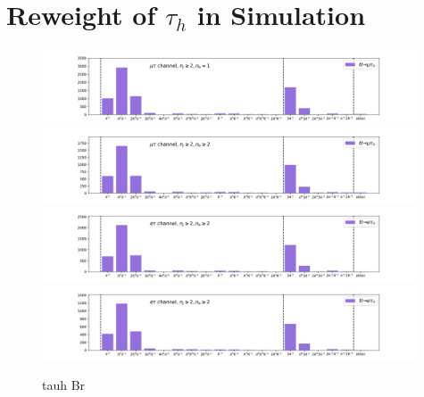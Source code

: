 \chapter{Reweight of \texorpdfstring{$\tau_h$}{Lg} in Simulation}


\begin{figure}
    \centering
    \includegraphics[width=0.99\textwidth]{chapters/Appendix/sectionTauBr/figures/tauhDecay_mutau.png}
    \includegraphics[width=0.99\textwidth]{chapters/Appendix/sectionTauBr/figures/tauhDecay_mutau2.png}
    \includegraphics[width=0.99\textwidth]{chapters/Appendix/sectionTauBr/figures/tauhDecay_etau.png}
    \includegraphics[width=0.99\textwidth]{chapters/Appendix/sectionTauBr/figures/tauhDecay_etau2.png}


    \caption{tauh Br}
    \label{fig:appendix:reweightTauhBr:tauhBr}
\end{figure}